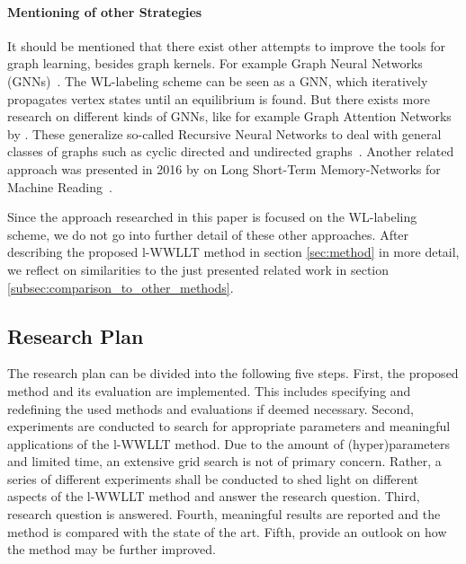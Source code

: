 		\paragraph{Mentioning of other Strategies}
		It should be mentioned that there exist other attempts to improve the tools for graph learning, besides graph kernels.
		For example Graph Neural Networks (GNNs)~\cite{2009_Scarselli_IEEE, 2020_Dwivedi_CONF, 2019_Xu_CONF}.
		The WL-labeling scheme can be seen as a GNN, which iteratively propagates vertex states until an equilibrium is found.
		But there exists more research on different kinds of GNNs, like for example Graph Attention Networks by \citeauthor{2017_Velickovic_ICLR}.
		These generalize so-called Recursive Neural Networks to deal with general classes of graphs such as cyclic directed and undirected graphs~\cite{2017_Velickovic_ICLR}.
		Another related approach was presented in 2016 by \citeauthor{2016_Cheng_CONF} on Long Short-Term Memory-Networks for Machine Reading~\cite{2016_Cheng_CONF}.\newline	
		
		Since the approach researched in this paper is focused on the WL-labeling scheme, we do not go into further detail of these other approaches.
		After describing the proposed l-WWLLT method in section \ref{sec:method} in more detail, we reflect on similarities to the just presented related work in section \ref{subsec:comparison_to_other_methods}.
	
    \subsection{Research Plan} \label{subsec:research_plan}
                
        The research plan can be divided into the following five steps.
        First, the proposed method and its evaluation are implemented.
        This includes specifying and redefining the used methods and evaluations if deemed necessary.
        Second, experiments are conducted to search for appropriate parameters and meaningful applications of the l-WWLLT method.        
        Due to the amount of (hyper)parameters and limited time, an extensive grid search is not of primary concern.
        Rather, a series of different experiments shall be conducted to shed light on different aspects of the l-WWLLT method and answer the research question.
        Third, research question is answered.
        Fourth, meaningful results are reported and the method is compared with the state of the art.
        Fifth, provide an outlook on how the method may be further improved.
        
